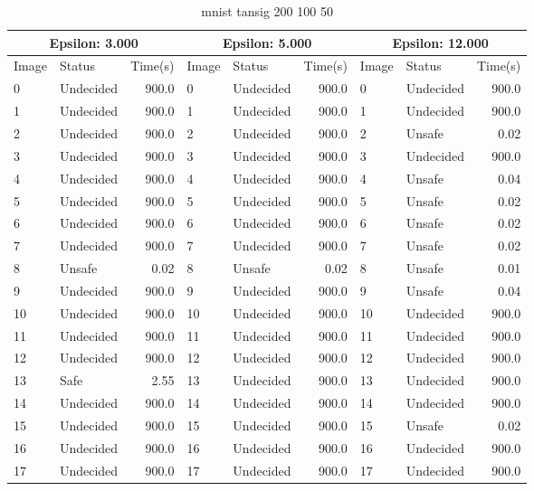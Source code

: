 \begin{table}[!ht]
  \centering
  \caption{mnist tansig 200 100 50}
  \footnotesize
  \begin{tabular}{|llr|llr|llr|}
    \toprule
    \multicolumn{3}{|c|}{Epsilon: 3.000} & \multicolumn{3}{|c|}{Epsilon: 5.000} & \multicolumn{3}{|c|}{Epsilon: 12.000} \\
    \midrule
    Image & Status & Time(s) &Image & Status & Time(s) &Image & Status & Time(s)\\ 
    \midrule
    0 & Undecided & 900.0 &    0 & Undecided & 900.0 &    0 & Undecided & 900.0\\ 
    1 & Undecided & 900.0 &    1 & Undecided & 900.0 &    1 & Undecided & 900.0\\ 
    2 & Undecided & 900.0 &    2 & Undecided & 900.0 &    2 & Unsafe & 0.02\\ 
    3 & Undecided & 900.0 &    3 & Undecided & 900.0 &    3 & Undecided & 900.0\\ 
    4 & Undecided & 900.0 &    4 & Undecided & 900.0 &    4 & Unsafe & 0.04\\ 
    5 & Undecided & 900.0 &    5 & Undecided & 900.0 &    5 & Unsafe & 0.02\\ 
    6 & Undecided & 900.0 &    6 & Undecided & 900.0 &    6 & Unsafe & 0.02\\ 
    7 & Undecided & 900.0 &    7 & Undecided & 900.0 &    7 & Unsafe & 0.02\\ 
    8 & Unsafe & 0.02 &    8 & Unsafe & 0.02 &    8 & Unsafe & 0.01\\ 
    9 & Undecided & 900.0 &    9 & Undecided & 900.0 &    9 & Unsafe & 0.04\\ 
    10 & Undecided & 900.0 &    10 & Undecided & 900.0 &    10 & Undecided & 900.0\\ 
    11 & Undecided & 900.0 &    11 & Undecided & 900.0 &    11 & Undecided & 900.0\\ 
    12 & Undecided & 900.0 &    12 & Undecided & 900.0 &    12 & Undecided & 900.0\\ 
    13 & Safe & 2.55 &    13 & Undecided & 900.0 &    13 & Undecided & 900.0\\ 
    14 & Undecided & 900.0 &    14 & Undecided & 900.0 &    14 & Undecided & 900.0\\ 
    15 & Undecided & 900.0 &    15 & Undecided & 900.0 &    15 & Unsafe & 0.02\\ 
    16 & Undecided & 900.0 &    16 & Undecided & 900.0 &    16 & Undecided & 900.0\\ 
    17 & Undecided & 900.0 &    17 & Undecided & 900.0 &    17 & Undecided & 900.0\\ 

\end{tabular}
\end{table}
